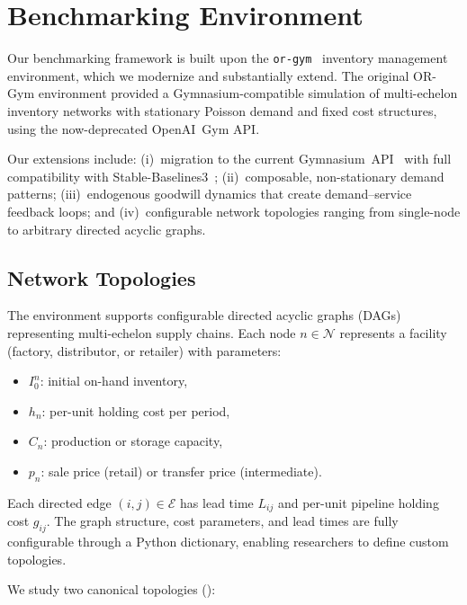 
\section{Benchmarking Environment}\label{sec:env}

Our benchmarking framework is built upon the
\texttt{or-gym}~\citep{hubbs2020orgym} inventory management environment,
which we modernize and substantially extend. The original OR-Gym
environment provided a Gymnasium-compatible simulation of multi-echelon
inventory networks with stationary Poisson demand and fixed cost
structures, using the now-deprecated OpenAI~Gym API.

Our extensions include: (i)~migration to the current
Gymnasium~API~\citep{brockman2016openai} with full compatibility with
Stable-Baselines3~\citep{raffin2021stable};
(ii)~composable, non-stationary demand patterns;
(iii)~endogenous goodwill dynamics that create demand--service feedback
loops; and (iv)~configurable network topologies ranging from single-node
to arbitrary directed acyclic graphs.

\subsection{Network Topologies}

The environment supports configurable directed acyclic graphs (DAGs)
representing multi-echelon supply chains. Each node
$n \in \mathcal{N}$ represents a facility (factory, distributor, or
retailer) with parameters:
\begin{itemize}
  \item $I_0^n$: initial on-hand inventory,
  \item $h_n$: per-unit holding cost per period,
  \item $C_n$: production or storage capacity,
  \item $p_n$: sale price (retail) or transfer price (intermediate).
\end{itemize}

Each directed edge $(i,j) \in \mathcal{E}$ has lead time $L_{ij}$ and
per-unit pipeline holding cost $g_{ij}$. The graph structure, cost
parameters, and lead times are fully configurable through a Python
dictionary, enabling researchers to define custom topologies.

We study two canonical topologies ():

